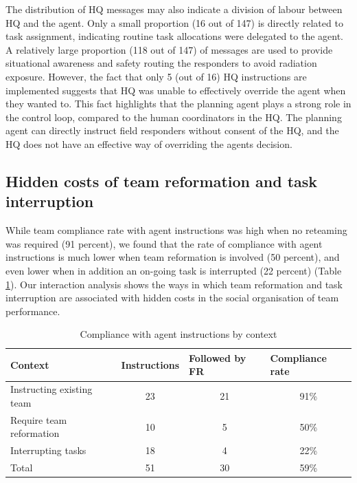 The distribution of HQ messages may also indicate a division of labour between HQ and the agent. Only a small proportion (16 out of 147) is directly related to task assignment, indicating routine task allocations were delegated to the agent. A relatively large proportion (118 out of 147) of messages are used to provide situational awareness and safety routing the responders to avoid radiation exposure. However, the fact that only 5 (out of 16) HQ instructions are implemented suggests that HQ was unable to effectively override the agent when they wanted to. This fact highlights that the planning agent plays a strong role in the control loop, compared to the human coordinators in the HQ. The planning agent can directly instruct field responders without consent of the HQ, and the HQ does not have an effective way of overriding the agents decision. \\

\subsection{Hidden costs of team reformation and task interruption}
While team compliance rate with agent instructions was high when no reteaming was required (91 percent), we found that the rate of compliance with agent instructions is much lower when team reformation is involved (50 percent), and even lower when in addition an on-going task is interrupted (22 percent) (Table \ref{tab:compliancerate}). Our interaction analysis shows the ways in which team reformation and task interruption are associated with hidden costs in the social organisation of team performance.  \\

\begin{table}[h]
\footnotesize
\begin{tabular}{l|ccc}
Context                   & \multicolumn{1}{l}{Instructions} & \multicolumn{1}{l}{Followed by FR} & \multicolumn{1}{l}{Compliance rate} \\ \hline
Instructing existing team & 23                               & 21                                 & 91\%                                \\
Require team reformation  & 10                               & 5                                  & 50\%                                \\
Interrupting tasks        & 18                               & 4                                  & 22\%                                \\
Total                     & 51                               & 30                                 & 59\%                               
\end{tabular}
\caption{Compliance with agent instructions by context}
\label{tab:compliancerate}
\end{table}

